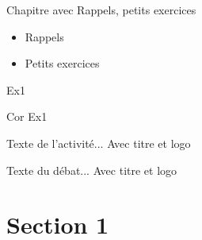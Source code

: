\documentclass[nocrop]{sesamanuel}
\begin{document}
%

\begin{prerequis}[Prérequis - G1]
  Chapitre avec Rappels, petits exercices  
  \begin{itemize}
  \item Rappels
  \item Petits exercices
  \end{itemize}
\end{prerequis}

\begin{autoeval}  
    \begin{exercice}
      Ex1
    \end{exercice}
    \begin{corrige}
      Cor Ex1
    \end{corrige}
\end{autoeval}

\activites
\begin{activite}
  Texte de l’activité... Avec titre et logo
\end{activite}
\begin{debat}
  Texte du débat... Avec titre et logo
\end{debat}

\cours
\section{Section 1}
\end{document}
